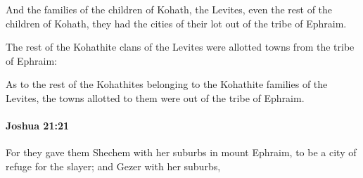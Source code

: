 			\begin{versebox}
					\item[BHS] 
					\item[ASV] And the families of the children of Kohath, the Levites, even the rest of the children of Kohath, they had the cities of their lot out of the tribe of Ephraim.
					\item[NIV] The rest of the Kohathite clans of the Levites were allotted towns from the tribe of Ephraim:
					\item[NRSV] As to the rest of the Kohathites belonging to the Kohathite families of the Levites, the towns allotted to them were out of the tribe of Ephraim.
			\end{versebox}

		\paragraph{Joshua 21:21} %
			\label{JOSHUA-21-21}

			For they gave them Shechem with her suburbs in mount Ephraim, to be a city of refuge for the slayer; and Gezer with her suburbs,

